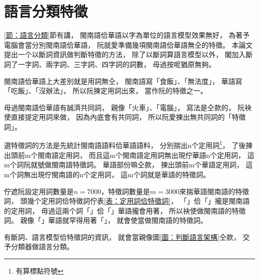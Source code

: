 \section{語言分類特徵}
\label{節：語言分類特徵}

\ref{節：語言分類}節有講，
閩南語佮華語以字為單位的語言模型效果無好，
為著予電腦會當分別閩南語佮華語，
阮就愛準備幾項閩南語佮華語無仝的特徵。
本論文提出一个以斷詞資訊做判斷特徵的方法，
除了以斷詞算語言模型以外，
閣加入斷詞了一字詞、兩字詞、三字詞、四字詞的詞數，
毋過按呢猶原無夠。

閩南語佮華語上大差別就是用詞無仝，
閩南語寫「食飯」、「無法度」，
華語寫「吃飯」、「沒辦法」，
所以阮揀定用詞出來，
當作阮的特徵之一。

毋過閩南語佮華語有誠濟共同詞，
親像「火車」、「電腦」，
寫法是仝款的，
阮袂使直接提定用詞來做，
因為內底會有共同詞，
所以阮愛揀出無共同詞的「特徵詞」。

選特徵詞的方法是先統計閩南語語料佮華語語料，
分別揣出n个定用詞\footnote{有算標點符號}，
了後揀出頭前m个閩南語定用詞，
而且這m个閩南語定用詞無出現佇華語n个定用詞，
這m个詞阮就號做閩南語特徵詞。
華語部份嘛仝款，
揀出頭前m个華語定用詞，
這m个詞無出現佇閩南語的n个定用詞，
這m个詞就是華語的特徵詞。

佇遮阮設$定用詞數量是n=7000，特徵詞數量是m=3000$來揣華語閩南語的特徵詞，
頭幾个定用詞佮特徵詞佇表\ref{表：定用詞佮特徵詞}，
「」佮「」攏是閩南語的定用詞，
毋過這兩个詞「」佮「」華語攏會用著，
所以袂使做閩南語的特徵詞。
親像「」華語就罕得用著「」，
就會使當做閩南語的特徵詞。

有斷詞、語言模型佮特徵詞的資訊，
就會當親像圖\ref{圖：判斷語言架構}仝款，
交予分類器做語言分類。

